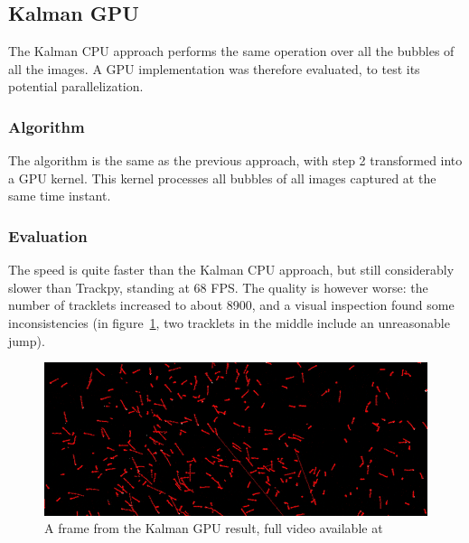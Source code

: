 \subsection{Kalman GPU}
\label{sec:link2d:kalman-gpu}

The Kalman CPU approach performs the same operation over all the bubbles of all the images.
A GPU implementation was therefore evaluated, to test its potential parallelization.

\subsubsection{Algorithm}

The algorithm is the same as the previous approach, with step 2 transformed into a GPU kernel.
This kernel processes all bubbles of all images captured at the same time instant.

\subsubsection{Evaluation}

The speed is quite faster than the Kalman CPU approach, but still considerably slower than Trackpy, standing at 68 FPS.
The quality is however worse: the number of tracklets increased to about 8900, and a visual inspection found some inconsistencies (in figure~\ref{fig:linkDD:kalmangpu}, two tracklets in the middle include an unreasonable jump).

\begin{figure}
	\centerline{\includegraphics[width=\locateimgsize]{images/link2d/kalman_GPU.png}}
	\caption{\centering A frame from the Kalman GPU \linkDD* result, full video available at~\cite{linkDD-kalman-gpu}}
	\label{fig:linkDD:kalmangpu}
\end{figure}
